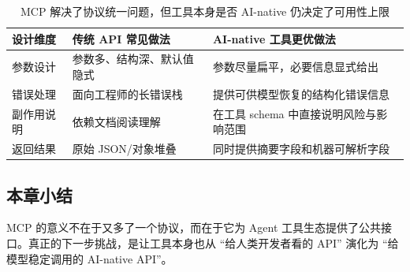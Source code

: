 \begin{table}[H]
\centering
\begin{tabular}{p{3.0cm}p{4.2cm}p{4.0cm}}
\toprule
\textbf{设计维度} & \textbf{传统 API 常见做法} & \textbf{AI-native 工具更优做法} \\
\midrule
参数设计 & 参数多、结构深、默认值隐式 & 参数尽量扁平，必要信息显式给出 \\
错误处理 & 面向工程师的长错误栈 & 提供可供模型恢复的结构化错误信息 \\
副作用说明 & 依赖文档阅读理解 & 在工具 schema 中直接说明风险与影响范围 \\
返回结果 & 原始 JSON/对象堆叠 & 同时提供摘要字段和机器可解析字段 \\
\bottomrule
\end{tabular}
\caption{MCP 解决了协议统一问题，但工具本身是否 AI-native 仍决定了可用性上限}
\end{table}

\subsection{本章小结}
MCP 的意义不在于又多了一个协议，而在于它为 Agent 工具生态提供了公共接口。真正的下一步挑战，是让工具本身也从 ``给人类开发者看的 API'' 演化为 ``给模型稳定调用的 AI-native API''。

